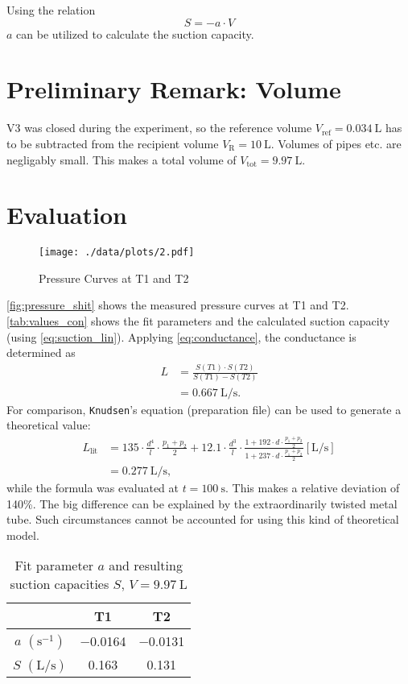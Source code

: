Using the relation
\begin{equation}\label{eq:suction_lin}
	S=-a\cdot V
\end{equation}
$a$ can be utilized to calculate the suction capacity.

\section*{Preliminary Remark: Volume}
V3 was closed during the experiment, so the reference volume $V_\text{ref}=\SI{0.034}{\liter}$ has to be subtracted from the recipient volume $V_\text{R}=\SI{10}{\liter}$.
Volumes of pipes etc. are negligably small.
This makes a total volume of $V_\text{tot}=\SI{9.97}{\liter}$.

\section{Evaluation}
\begin{figure}[tbp]
	\centering
	\texttt{[image: ./data/plots/2.pdf]}
	\caption[Pressure Curves for T1 and T2]{Pressure Curves at T1 and T2}
	\label{fig:pressure_shit}
\end{figure}
\autoref{fig:pressure_shit} shows the measured pressure curves at T1 and T2.
\autoref{tab:values_con} shows the fit parameters and the calculated suction capacity (using \autoref{eq:suction_lin}).
Applying \autoref{eq:conductance}, the conductance is determined as
\begin{align*}
	L &= \frac{S(T1)\cdot S(T2)}{S(T1)-S(T2)} \\
		&= \SI{0.667}{\liter\per\second}.
\end{align*}
For comparison, \texttt{Knudsen}'s equation (preparation file) can be used to generate a theoretical value:
\begin{align*}
	L_\text{lit} &= 135\cdot\frac{d^4}{l}\cdot\frac{p_1+p_2}{2}+\num{12.1}\cdot\frac{d^3}{l}\cdot\frac{1+192\cdot d\cdot\frac{p_1+p_2}{2}}{1+237\cdot d\cdot\frac{p_1+p_2}{2}} \left[\si{\liter\per\second}\right]	\\
	&=\SI{0.277}{\liter\per\second},
\end{align*}
while the formula was evaluated at $t=\SI{100}{\second}$.
This makes a relative deviation of \num{140}\%.
The big difference can be explained by the extraordinarily twisted metal tube.
Such circumstances cannot be accounted for using this kind of theoretical model.
\begin{table}[b!]
	\centering
	\label{tab:values_con}
	\caption[Fit parameters and suction capacities]{Fit parameter $a$ and resulting suction capacities $S$, $V=\SI{9.97}{\liter}$}
	\begin{tabular}{S|SS}
		\toprule
		{}&	{T1}&	{T2}\\
		\midrule
		{$a$ $(\si{\second}^{-1})$}	&	\num{-0.0164}	&	\num{-0.0131}	\\
		{$S$ $(\si{\liter\per\second})$}	&	0.163	&	0.131	\\
		\bottomrule
	\end{tabular}
\end{table}
